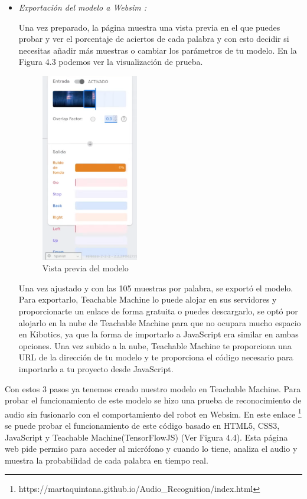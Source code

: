 \begin{itemize}
\item  \textit{Exportación del modelo a Websim :}

Una vez preparado, la página muestra una vista previa en el que puedes probar y ver el porcentaje de aciertos de cada palabra y con esto decidir si necesitas añadir más muestras o cambiar los parámetros de tu modelo.  En la Figura 4.3 podemos ver la visualización de prueba.

\begin{figure}[H]
 \centering
    \includegraphics[width=0.4\textwidth, height=0.6\textwidth]{chapters/images/teachablemachine2.png}
    \caption{Vista previa del modelo}
\end{figure}
 

Una vez ajustado y con las 105 muestras por palabra, se exportó el modelo. 
Para exportarlo, Teachable Machine lo puede alojar en sus servidores y proporcionarte  un enlace de forma gratuita o puedes descargarlo, se optó por alojarlo en la nube de Teachable Machine para que no ocupara mucho espacio en Kibotics, ya que la forma de importarlo  a JavaScript era similar en ambas opciones.
Una vez subido a la nube, Teachable Machine te proporciona una URL de la dirección de tu modelo y  te proporciona el código necesario para importarlo a tu proyecto desde JavaScript.
\end{itemize}

Con estos 3 pasos ya tenemos creado nuestro modelo en Teachable Machine. Para probar el funcionamiento de este modelo se hizo una prueba de reconocimiento de audio sin fusionarlo con el comportamiento del robot en Websim. En este enlace \footnote{https://martaquintana.github.io/Audio\_Recognition/index.html} se puede probar el funcionamiento de este código basado en HTML5, CSS3, JavaScript y Teachable Machine(TensorFlowJS) (Ver Figura 4.4). Esta página web pide permiso para acceder al micrófono y cuando lo tiene, analiza el audio  y muestra la probabilidad de cada palabra en tiempo real.  


